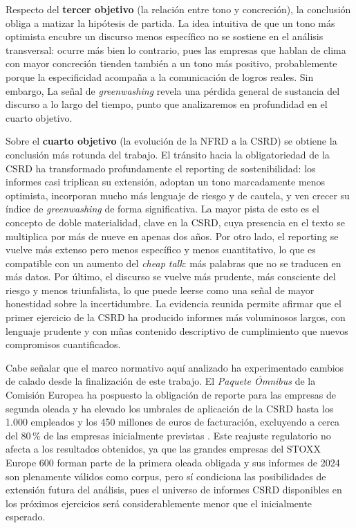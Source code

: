 Respecto del \textbf{tercer objetivo} (la relación entre
tono y concreción), la conclusión obliga a matizar la hipótesis de partida. La idea intuitiva de
que un tono más optimista encubre un discurso menos específico no se sostiene en el análisis transversal: 
ocurre más bien lo contrario, pues las empresas que hablan de clima con mayor concreción tienden también a un tono más
positivo, probablemente porque la especificidad acompaña a la comunicación de logros reales. Sin embargo, La señal de
\textit{greenwashing} revela una pérdida general de sustancia del discurso a lo largo del tiempo, punto que analizaremos en 
profundidad en el cuarto objetivo.

Sobre el \textbf{cuarto objetivo} (la evolución de la NFRD a la CSRD) se obtiene la conclusión
más rotunda del trabajo. El tránsito hacia la obligatoriedad de la CSRD ha transformado
profundamente el reporting de sostenibilidad: los informes casi triplican su extensión, adoptan
un tono marcadamente menos optimista, incorporan mucho más lenguaje de riesgo y de cautela, y
ven crecer su índice de \textit{greenwashing} de forma significativa. La mayor pista de esto es el concepto de doble materialidad, clave en la CSRD,
cuya presencia en el texto se multiplica por más de nueve en apenas dos años. Por otro lado, el reporting se vuelve
más extenso pero menos específico y menos cuantitativo, lo que es compatible con un aumento del
\textit{cheap talk}: más palabras que no se traducen en más datos. Por último, el discurso se
vuelve más prudente, más consciente del riesgo y menos triunfalista, lo que puede leerse
como una señal de mayor honestidad sobre la incertidumbre. La evidencia reunida permite
afirmar que el primer ejercicio de la CSRD ha producido informes más voluminosos largos, con lenguaje prudente
y con mñas contenido descriptivo de cumplimiento que
nuevos compromisos cuantificados.

Cabe señalar que el marco normativo aquí analizado ha experimentado cambios de calado desde la
finalización de este trabajo. El \textit{Paquete Ómnibus} de la Comisión Europea
ha pospuesto la obligación de reporte para las empresas de segunda oleada y ha
elevado los umbrales de aplicación de la CSRD hasta los 1.000 empleados y los 450 millones
de euros de facturación, excluyendo a cerca del 80\,\% de las empresas inicialmente previstas
\parencite{omnibus2025,omnibus2026}. Este reajuste regulatorio no afecta a los resultados
obtenidos, ya que las grandes empresas del STOXX Europe 600 forman parte de la primera oleada
obligada y sus informes de 2024 son plenamente válidos como corpus, pero sí condiciona
las posibilidades de extensión futura del análisis, pues el universo de informes CSRD
disponibles en los próximos ejercicios será considerablemente menor que el inicialmente
esperado.

